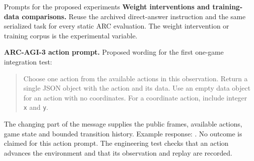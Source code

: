 \begin{frame}[t]{Prompts for the proposed experiments}
\med
\textbf{Weight interventions and training-data comparisons.} Reuse the archived direct-answer instruction and the same serialized task for every static ARC evaluation. The weight intervention or training corpus is the experimental variable.
\par\vspace{5mm}
\textbf{ARC-AGI-3 action prompt.} Proposed wording for the first one-game integration test:
\par\vspace{2mm}
\begin{quote}\smallbody
Choose one action from the available actions in this observation. Return a single JSON object with the action and its data. Use an empty data object for an action with no coordinates. For a coordinate action, include integer \texttt{x} and \texttt{y}.
\end{quote}
\smallbody The changing part of the message supplies the public frames, available actions, game state and bounded transition history. Example response: \texttt{}.
\vfill\smallbody No outcome is claimed for this action prompt. The engineering test checks that an action advances the environment and that its observation and replay are recorded.
\end{frame}
